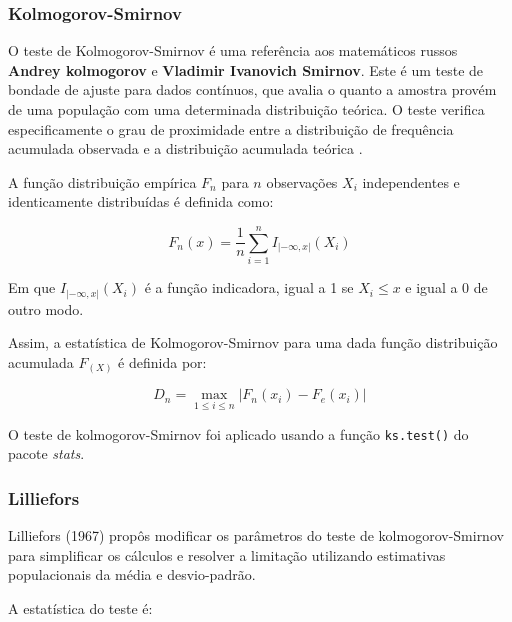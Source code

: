 \documentclass[a4paper,11pt]{article} %
\begin{document}
\subsubsection{Kolmogorov-Smirnov}

O teste de Kolmogorov-Smirnov é uma referência aos matemáticos russos \textbf{Andrey kolmogorov} e \textbf{Vladimir Ivanovich Smirnov}. Este é um teste de bondade de ajuste para dados contínuos, que avalia o quanto a amostra provém de uma população com uma determinada distribuição teórica. O teste verifica especificamente o grau de proximidade entre a distribuição de frequência acumulada observada e a distribuição acumulada teórica \cite{lopes2013utilizaccao}.  

\vspace{0.5cm}

A função distribuição empírica $F_{n}$ para $n$ observações $X_{i}$ independentes e identicamente distribuídas é definida como:

\begin{equation}
    F_{n}(x) = \frac{1}{n} \sum_{i=1}^{n}I_{|- \infty, x|}(X_{i})
\end{equation}

Em que $I_{|- \infty, x|}(X_{i})$ é a função indicadora, igual a 1 se $X_{i} \leq  x$ e igual a 0 de outro modo.

\vspace{0.5cm}

Assim, a  estatística de Kolmogorov-Smirnov para uma dada função distribuição acumulada $F_{(X)}$ é definida por:

\begin{equation}
    D_{n} = \max_{1 \leq i \leq n} \left| F_{n}(x_i) - F_{e}(x_i) \right|
\end{equation}

O teste de kolmogorov-Smirnov foi aplicado usando a função \texttt{ks.test()} do pacote \textit{stats}.

\subsubsection{Lilliefors}

Lilliefors (1967) propôs modificar os parâmetros do teste de kolmogorov-Smirnov para simplificar os cálculos e resolver a limitação utilizando estimativas populacionais da média e desvio-padrão.

\vspace{0.5cm}

A estatística do teste é:
\end{document}
